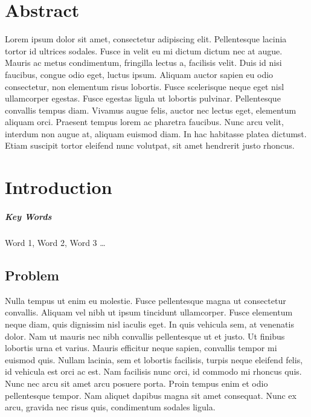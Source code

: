 



\chapter{Abstract}
Lorem ipsum dolor sit amet, consectetur adipiscing elit. Pellentesque lacinia tortor id ultrices sodales. Fusce in velit eu mi dictum dictum nec at augue. Mauris ac metus condimentum, fringilla lectus a, facilisis velit. Duis id nisi faucibus, congue odio eget, luctus ipsum. Aliquam auctor sapien eu odio consectetur, non elementum risus lobortis. Fusce scelerisque neque eget nisl ullamcorper egestas. Fusce egestas ligula ut lobortis pulvinar. Pellentesque convallis tempus diam. Vivamus augue felis, auctor nec lectus eget, elementum aliquam orci. Praesent tempus lorem ac pharetra faucibus. Nunc arcu velit, interdum non augue at, aliquam euismod diam. In hac habitasse platea dictumst. Etiam suscipit tortor eleifend nunc volutpat, sit amet hendrerit justo rhoncus.


\chapter{Introduction}

\paragraph{Key Words} Word 1, Word 2, Word 3 \dots

\section{Problem} 
Nulla tempus ut enim eu molestie. Fusce pellentesque magna ut consectetur convallis. Aliquam vel nibh ut ipsum tincidunt ullamcorper. Fusce elementum neque diam, quis dignissim nisl iaculis eget. In quis vehicula sem, at venenatis dolor. Nam ut mauris nec nibh convallis pellentesque ut et justo. Ut finibus lobortis urna et varius. Mauris efficitur neque sapien, convallis tempor mi euismod quis. Nullam lacinia, sem et lobortis facilisis, turpis neque eleifend felis, id vehicula est orci ac est. Nam facilisis nunc orci, id commodo mi rhoncus quis. Nunc nec arcu sit amet arcu posuere porta. Proin tempus enim et odio pellentesque tempor. Nam aliquet dapibus magna sit amet consequat. Nunc ex arcu, gravida nec risus quis, condimentum sodales ligula.

